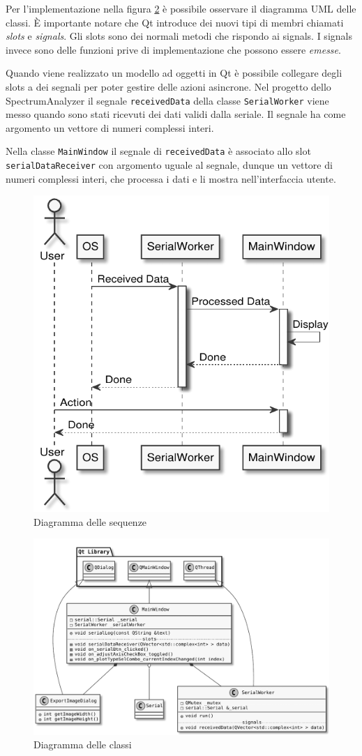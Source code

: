 Per l'implementazione nella figura \ref{fig:desktop-classes} \`e possibile
osservare il diagramma UML delle classi. \`E importante notare che Qt 
introduce dei nuovi tipi di membri chiamati \emph{slots} e \emph{signals}.
Gli slots sono dei normali metodi che rispondo ai signals. I signals invece
sono delle funzioni prive di implementazione che possono essere \emph{emesse}.

Quando viene realizzato un modello ad oggetti in Qt \`e possibile collegare
degli slots a dei segnali per poter gestire delle azioni asincrone.  Nel
progetto dello SpectrumAnalyzer il segnale \texttt{receivedData} della classe
\texttt{SerialWorker} viene messo quando sono stati ricevuti dei dati validi
dalla seriale. Il segnale ha come argomento un vettore di numeri complessi
interi.

Nella classe \texttt{MainWindow} il segnale di \texttt{receivedData} \`e
associato allo slot \texttt{serialDataReceiver} con argomento uguale al
segnale, dunque un vettore di numeri complessi interi, che processa i dati e li
mostra nell'interfaccia utente.

\begin{figure}[H] \centering
    \includegraphics[width=.6\textwidth]{figures/uml/desktop-sequence}
    \caption{Diagramma delle sequenze \label{fig:desktop-sequence}}
\end{figure}

\begin{figure}[H] \centering
    \includegraphics[width=\textwidth]{figures/uml/desktop-classes}
    \caption{Diagramma delle classi \label{fig:desktop-classes}}
\end{figure}

